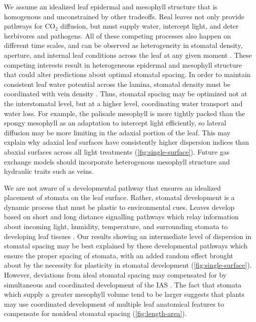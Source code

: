 \documentclass[webpdf,large,modern,unnumsec,namedate]{oup-authoring-template}
\begin{document}
We assume an idealized leaf epidermal and mesophyll structure that is
homogenous and unconstrained by other tradeoffs. Real leaves not only
provide pathways for CO\(_2\) diffusion, but must supply water,
intercept light, and deter herbivores and pathogens. All of these
competing processes also happen on different time scales, and can be
observed as heterogeneity in stomatal density, aperture, and internal
leaf conditions across the leaf at any given moment
\citep{lawson_nature_1998, lawson_spatial_1999}. These competing
interests result in heterogeneous epidermal and mesophyll structure that
could alter predictions about optimal stomatal spacing. In order to
maintain consistent leaf water potential across the lamina, stomatal
density must be coordinated with vein density
\citep{fiorin_transport_2016}. Thus, stomatal spacing may be optimized
not at the interstomatal level, but at a higher level, coordinating
water transport and water loss. For example, the palisade mesophyll is
more tightly packed than the spongy mesophyll as an adaptation to
intercept light efficiently, so lateral diffusion may be more limiting
in the adaxial portion of the leaf. This may explain why adaxial leaf
surfaces have consistently higher dispersion indices than abaxial
surfaces across all light treatments (\autoref{fig:single-surface}).
Future gas exchange models should incorporate heterogenous mesophyll
structure and hydraulic traits such as veins.

We are not aware of a developmental pathway that ensures an idealized
placement of stomata on the leaf surface. Rather, stomatal development
is a dynamic process that must be plastic to environmental cues. Leaves
develop based on short and long distance signalling pathways which relay
information about incoming light, humidity, temperature, and surrounding
stomata to developing leaf tissues \citep{pillitteri_mechanisms_2012}.
Our results showing an intermediate level of dispersion in stomatal
spacing may be best explained by these developmental pathways which
ensure the proper spacing of stomata, with an added random effect
brought about by the necessity for plasticity in stomatal development
(\autoref{fig:single-surface}). However, deviations from ideal stomatal
spacing may compensated for by simultaneous and coordinated development
of the IAS \citep{baillie_developmental_2020}. The fact that stomata
which supply a greater mesophyll volume tend to be larger suggests that
plants may use coordinated development of multiple leaf anatomical
features to compensate for nonideal stomatal spacing
(\autoref{fig:length-area}).
\end{document}
